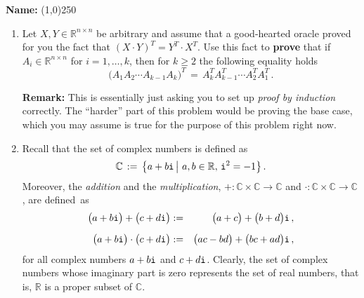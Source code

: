 \documentclass[11pt,table]{article}
\newcommand{\<}			{\langle}
\renewcommand{\>}      		{\rangle}
\newcommand{\bC}		{\mathbb{C}}
\newcommand{\bR}		{\mathbb{R}}
\def\Rnn{\mathbb{R}^{n\times n}}
\newcommand {\basicbox} 		{\begin{tcolorbox}[width=\textwidth,colback={black!1}]}
\newcommand {\overbox}      {\end{tcolorbox}}
\begin{document}
	\vspace*{9mm}
	
	\noindent
	{\bf Name:} \line(1,0){250}  \\
	
	\vspace*{8mm}


\vspace{5mm}


\newpage


\begin{enumerate}


\item Let $X, Y \in \Rnn$ be arbitrary and assume that a good-hearted oracle 
	proved for you  the fact that  
	$ (X \cdot Y ) ^T = Y^T \cdot X^T$. 
	Use this fact to {\bf prove} that if $A_i \in \mathbb{R}^{n \times n} $ for $i=1,\ldots, k$, 
	then for $k \geq 2$ the following equality holds 
	\begin{equation} \label{eqn-prob1}
	\Big(A_1A_2\cdots A_{k-1} A_k \Big)^T \, = \, A_k^TA_{k-1}^T \cdots A_2^T A_1^T \, .
	\end{equation} 

	
{\bf Remark:} 
This is essentially just asking you 
to set up {\em proof by induction} correctly. 
The ``harder'' part of this problem would be proving the base case, 
which you may assume is true for the purpose of this problem right now. 

\medskip
\item \quad {\, } 

\basicbox
Recall that the set of complex numbers is defined as 
\begin{equation} \label{eq:complex-num-set}
\mathbb{C} 
\, := \, 
\big\{ 
a + b {\tt i} \, \big| \,\, a, b \in \bR, \, {\tt i}^2 = -1 
\big\} 
\, .
\end{equation} 
Moreover, the {\em addition} and the {\em multiplication}, 
$+: \bC \times \bC \rightarrow \bC$ 
and
$\cdot : \bC \times \bC \rightarrow \bC$, 
are defined~as 
\begin{eqnarray} \label{eq:add-cmplx-num-def}
\big( a + b {\tt i} \big) 
+ 
\big( c + d {\tt i} \big) 
& := & 
\big(a + c \big) + \big(b + d \big) {\tt i} \, ,
\\[2mm]  \label{eq:mult-cmplx-num-def}
\big( a + b {\tt i} \big) 
\cdot
\big( c + d {\tt i} \big) 
& := & 
\big(ac - bd \big) + \big(bc + ad \big) {\tt i} \, ,
\end{eqnarray} 
for all complex numbers $a+b{\tt i}$ and $c + d {\tt i}$. 
Clearly, the set of complex numbers whose imaginary part is 
zero represents the set of real numbers, 
that is, $\bR$ is a proper subset of $\bC$. 
\overbox


\end{enumerate}
\end{document}

